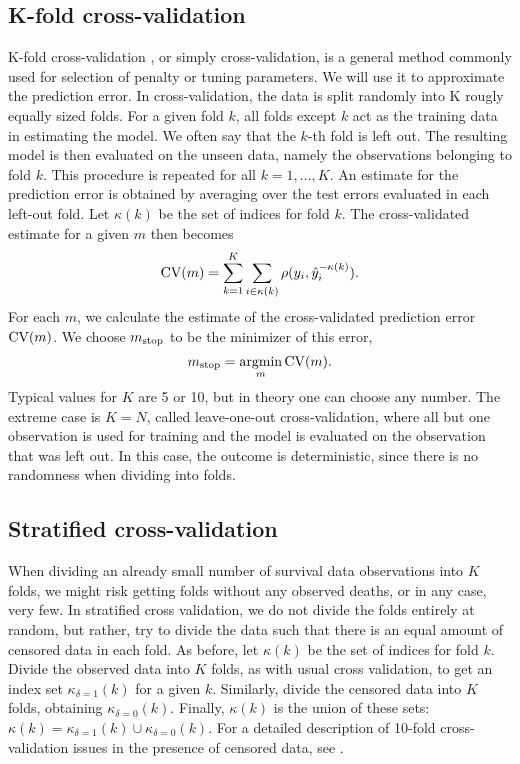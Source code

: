 \subsection{K-fold cross-validation}\label{subsec:K-fold}
K-fold cross-validation \citep{lachenbruch}, or simply cross-validation, is a general method commonly used for selection of penalty or tuning parameters. We will use it to approximate the prediction error. In cross-validation, the data is split randomly into K rougly equally sized folds. For a given fold $k$, all folds except $k$ act as the training data in estimating the model. We often say that the $k$-th fold is left out. The resulting model is then evaluated on the unseen data, namely the observations belonging to fold $k$. This procedure is repeated for all $k=1,\ldots,K$. An estimate for the prediction error is obtained by averaging over the test errors evaluated in each left-out fold. Let $\kappa(k)$ be the set of indices for fold $k$. The cross-validated estimate for a given $m$ then becomes
\begin{equation}
    \operatorname{CV}(m)=\sum_{k=1}^K\sum_{i\in\kappa(k)}\rho(y_i,\hat{y}_i^{-\kappa(k)}).
\end{equation}
For each $m$, we calculate the estimate of the cross-validated prediction error $\operatorname{CV}(m)$. We choose $m_{\text{stop}}$ to be the minimizer of this error,
\begin{equation}
    m_{\text{stop}}=\operatorname*{argmin}_{m}\operatorname{CV}(m).
\end{equation}
Typical values for $K$ are 5 or 10, but in theory one can choose any number. The extreme case is $K=N$, called leave-one-out cross-validation, where all but one observation is used for training and the model is evaluated on the observation that was left out. In this case, the outcome is deterministic, since there is no randomness when dividing into folds.

\subsection{Stratified cross-validation}
When dividing an already small number of survival data observations into $K$ folds, we might risk getting folds without any observed deaths, or in any case, very few. In stratified cross validation, we do not divide the folds entirely at random, but rather, try to divide the data such that there is an equal amount of censored data in each fold.
As before, let $\kappa(k)$ be the set of indices for fold $k$. Divide the observed data into $K$ folds, as with usual cross validation, to get an index set $\kappa_{\delta=1}(k)$ for a given $k$. Similarly, divide the censored data into $K$ folds, obtaining $\kappa_{\delta=0}(k)$. Finally, $\kappa(k)$ is the union of these sets: $\kappa(k)=\kappa_{\delta=1}(k)\cup\kappa_{\delta=0}(k)$.
For a detailed description of 10-fold cross-validation issues in the presence of censored data, see \citet{kohavi}.

